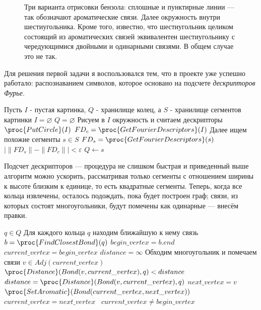 \begin{figure}[h]
\caption{Три варианта отрисовки бензола: сплошные и пунктирные линии --- так обозначают ароматические связи. Далее окружность внутри шестиугольника. Кроме того, известно, что шестиугольник целиком состоящий из ароматических связей эквивалентен шестиугольнику с чередующимися двойными и одинарными связями. В общем случае это не так.}
\end{figure}

\noindent
Для решения первой задачи я воспользовался тем, что в проекте уже успешно работало: распознаванием символов, которое основано на подсчете 
\emph{дескрипторов Фурье}.

\begin{codebox}
  \li \Comment Пусть $I$ - пустая картинка, $Q$ - хранилище колец, а $S$ - хранилище сегментов картинки
  \li $I = \varnothing$
  \li $Q = \varnothing$
  \li \Comment Рисуем в $I$ окружность и считаем дескрипторы
  \li $\proc{PutCircle}(I)$
  \li $ FD_{c} = \proc{GetFourierDescriptors}(I)$
  \li \Comment Далее ищем похожие сегменты
  \li \For $s \in S$
  \li \Do $FD_{s} = \proc{GetFourierDescriptors}(s)$
  \li \If $ | \parallel FD_{s} \parallel - \parallel FD_{c} \parallel |  < \varepsilon $
  \li \Then $Q \gets s$  
\end{codebox}

\noindent
Подсчет дескрипторов --- процедура не слишком быстрая и приведенный выше алгоритм можно ускорить, рассматривая только сегменты
с отношением ширины к высоте близким к единице, то есть квадратные сегменты. Теперь, когда все кольца извлечены, осталось подождать, пока
будет построен граф; связи, из которых состоят многоугольники, будут помечены как одинарные --- внесём правки.

\begin{codebox}
  \li \For $q \in Q$
  \li \Comment Для каждого кольца $q$ находим ближайшую к нему связь
  \li \Do $b = \proc{FindClosestBond}(q)$
  \li $begin\_vertex = b.end$
  \li $current\_vertex = begin\_vertex$
  \li $distance = \infty$
  \li \Comment Обходим многоугольник и помечаем связи 
  \li \Repeat 
  \li \For $v \in Adj(current\_vertex)$
  \li \Do \If $\proc{Distance}(Bond(v,current\_vertex), q) < distance $
  \li \Then $distance = \proc{Distance}(Bond(v,current\_vertex), q)$ 
  \li $next\_vertex = v $ \End \End
  \li $\proc{SetAromatic}(Bond(current\_vertex, next\_vertex))$
  \li $current\_vertex = next\_vertex$ \
  \li \Until $current\_vertex \ne begin\_vertex$
\end{codebox}

